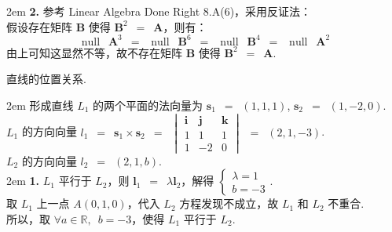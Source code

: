 \documentclass[UTF8,14pt,normal]{ctexart}
\begin{document}
    \hangindent 2em
    \noindent
    \textbf{2.} 参考 Linear Algebra Done Right 8.A(6)，采用反证法：\\
    假设存在矩阵 $ \mathbf{B} $ 使得 $ \mathbf{B}^{2} \enspace = \enspace \mathbf{A} $，则有：\\
    \[\operatorname{null} \enspace \mathbf{A}^{3} \enspace = \enspace \operatorname{null} \enspace \mathbf{B}^{6} \enspace = \enspace \operatorname{null} \enspace \mathbf{B}^{4} \enspace = \enspace \operatorname{null} \enspace \mathbf{A}^{2}\]
    由上可知这显然不等，故不存在矩阵 $ \mathbf{B} $ 使得 $ \mathbf{B}^{2} \enspace = \enspace \mathbf{A} $.

\clearpage

直线的位置关系.

    \hangindent 2em
    \noindent
    形成直线 $L_{1}$ 的两个平面的法向量为 $\boldsymbol{s}_{1} \enspace = \enspace (1,1,1)$, $\boldsymbol{s}_{2} \enspace = \enspace (1,-2,0)$.\\
    $L_{1}$ 的方向向量 $l_{1} \enspace = \enspace \boldsymbol{s}_{1} \times \boldsymbol{s}_{2} \enspace = \enspace
    \begin{vmatrix}
        \boldsymbol{i} & \boldsymbol{j} & \boldsymbol{k} \\
        1 & 1 & 1 \\
        1 & -2 & 0
    \end{vmatrix} \enspace = \enspace (2,1,-3)$.\\
    $L_{2}$ 的方向向量 $l_{2} \enspace = \enspace (2,1,b)$.\\

    \hangindent 2em
    \noindent
    \textbf{1.} $L_{1}$ 平行于 $L_{2}$，则 $\boldsymbol{l}_{1} \enspace = \enspace \lambda \boldsymbol{l}_{2}$，解得 $
    \begin{cases}
        \lambda = 1 \\
        b = -3
    \end{cases}$.\\
    取 $L_{1}$ 上一点 $A(0,1,0)$，代入 $L_{2}$ 方程发现不成立，故 $L_{1}$ 和 $L_{2}$ 不重合.\\
    所以，取 $\forall a \in \mathbb{R}, \enspace b = -3$，使得 $L_{1}$ 平行于 $L_{2}$.\\
\end{document}
